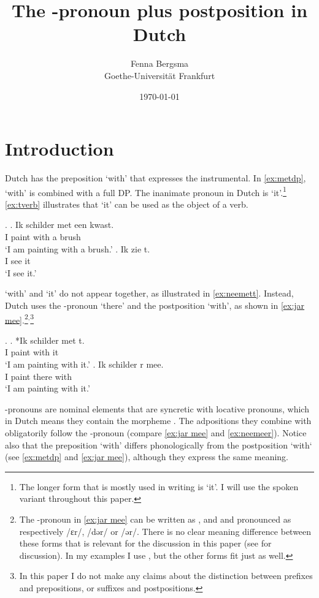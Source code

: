 \documentclass[11pt,a4paper]{article}
\title{The \tsc{r}-pronoun plus postposition \tit{waar mee} in Dutch}
\author{Fenna Bergsma\\Goethe-Universität Frankfurt}
\date{\today}
\begin{document}
\maketitle


\section{Introduction}

Dutch has the preposition  `with' that expresses the instrumental. In \ref{ex:metdp},  `with' is combined with a full DP. The inanimate pronoun in Dutch is  `it'.\footnote{The longer form that is mostly used in writing is  `it'. I will use the spoken variant  throughout this paper.} \ref{ex:tverb} illustrates that  `it' can be used as the object of a verb.

\ex.
\ag. Ik schilder met een kwast.\\
 I paint with a brush\\
 `I am painting with a brush.'\label{ex:metdp}
 \bg. Ik zie t.\\
  I see it\\
  `I see it.'\label{ex:tverb}

 `with' and  `it' do not appear together, as illustrated in \ref{ex:neemett}. Instead, Dutch uses the -pronoun  `there' and the postposition  `with', as shown in \ref{ex:jar mee}.\footnote{The -pronoun  in \ref{ex:jar mee} can be written as ,  and  and pronounced as respectively /ɛr/, /dər/ or /ər/. There is no clear meaning difference between these forms that is relevant for the discussion in this paper
(see \citet{wesseling2018} for discussion).
In my examples I use , but the other forms fit just as well.}$^,$\footnote{In this paper I do not make any claims about the distinction between prefixes and prepositions, or suffixes and postpositions.}

\ex.\label{ex:r meeconst}
\ag. *Ik schilder met t.\\
 I paint with it\\
 `I am painting with it.'\label{ex:neemett}
\bg. Ik schilder r mee.\\
 I paint there with\\
 `I am painting with it.'\label{ex:jar mee}

-pronouns are nominal elements that are syncretic with locative pronouns, which in Dutch means they contain the morpheme  \citep[cf.][]{riemsdijk1978,koopman1994}. The adpositions they combine with obligatorily follow the -pronoun (compare \ref{ex:jar mee} and \ref{ex:neemeer}).
Notice also that the preposition  `with' differs phonologically from the postposition  `with` (see \ref{ex:metdp} and \ref{ex:jar mee}), although they express the same meaning.
\end{document}
